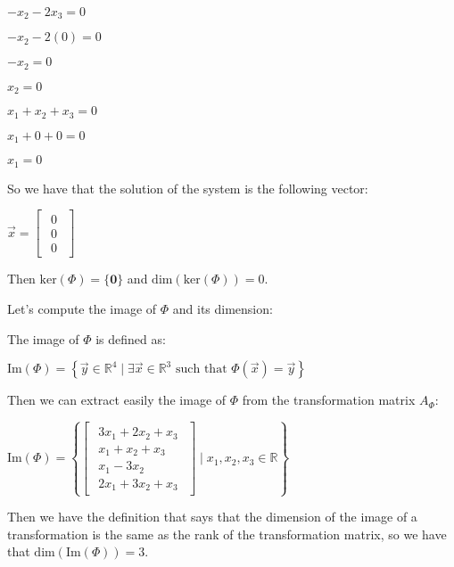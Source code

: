 \singlespacing

$-x_2 - 2x_3 = 0$

$-x_2 - 2(0) = 0$

$-x_2 = 0$

$x_2 = 0$

\singlespacing

$x_1 + x_2 + x_3 = 0$

$x_1 + 0 + 0 = 0$

$x_1 = 0$

\singlespacing

So we have that the solution of the system is the following vector:

\singlespacing

\begin{math}
    \vec{x}=\begin{bmatrix}
        \begin{array}{c}
            0 \\
            0 \\
            0
        \end{array}
    \end{bmatrix}
\end{math}

\singlespacing

Then $\text{ker}(\Phi) =  \{\mathbf{0}\}$ and $\text{dim}(\text{ker}(\Phi)) = 0$.

\singlespacing

Let's compute the image of $\Phi$ and its dimension:

\singlespacing

The image of $\Phi$ is defined as:

\singlespacing

\begin{math}
    \text{Im}(\Phi)=\left\{\vec{y} \in \mathbb{R}^4 \mid \exists \vec{x} \in \mathbb{R}^3 \text{ such that } \Phi(\vec{x})=\vec{y}\right\}
\end{math}

\singlespacing

Then we can extract easily the image of $\Phi$ from the transformation matrix $A_\Phi$:

\singlespacing

\begin{math}
    \text{Im}(\Phi)=\left\{
    \begin{bmatrix}
        \begin{array}{c}
            3x_1 + 2x_2 + x_3 \\
            x_1 + x_2 + x_3   \\
            x_1 - 3x_2        \\
            2x_1 + 3x_2 + x_3
        \end{array}
    \end{bmatrix}
    \mid x_1, x_2, x_3 \in \mathbb{R}
    \right\}
\end{math}

\singlespacing

Then we have the definition that says that the dimension of the image of a transformation is the same as the rank of the transformation matrix, so we have that $\text{dim} (\text{Im}(\Phi)) = 3$.